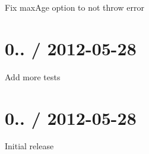 \begin{DoxyItemize}
\item Fix {\ttfamily max\+Age} option to not throw error
\end{DoxyItemize}

\section*{0.. / 2012-\/05-\/28 }


\begin{DoxyItemize}
\item Add more tests
\end{DoxyItemize}

\section*{0.. / 2012-\/05-\/28 }


\begin{DoxyItemize}
\item Initial release 
\end{DoxyItemize}